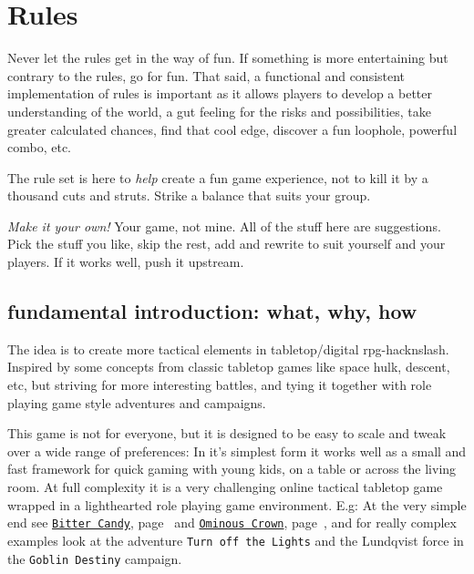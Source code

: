 

%
%


\cleardoublepage
\flushbottom


\chapter*{Rules}
Never let the rules get in the way of fun. If something is more entertaining but contrary to the rules, go for fun. That said, a functional and consistent implementation of rules is important as it allows players to develop a better understanding of the world, a gut feeling for the risks and possibilities, take greater calculated chances, find that cool edge, discover a fun loophole, powerful combo, etc.

The rule set is here to \emph{help} create a fun game experience, not to kill it by a thousand cuts and struts. Strike a balance that suits your group.

\emph{Make it your own!} Your game, not mine. All of the stuff here are suggestions. Pick the stuff you like, skip the rest, add and rewrite to suit yourself and your players. If it works well, push it upstream.


\section*{fundamental introduction: what, why, how}
The idea is to create more tactical elements in tabletop/digital rpg-hacknslash. Inspired by some concepts from classic tabletop games like space hulk, descent, etc, but striving for more interesting battles, and tying it together with role playing game style adventures and campaigns.

This game is not for everyone, but it is designed to be easy to scale and tweak over a wide range of preferences: In it's simplest form it works well as a small and fast framework for quick gaming with young kids, on a table or across the living room. At full complexity it is a very challenging online tactical tabletop game wrapped in a lighthearted role playing game environment.
E.g: At the very simple end see
\hyperref[sec:youngkids]{\texttt{Bitter Candy}}, page~\pageref{sec:youngkids} and
\hyperref[sec:basicenough]{\texttt{Ominous Crown}}, page~\pageref{sec:basicenough},
and for really complex examples look at the adventure
\texttt{Turn off the Lights} and
the Lundqvist force in the \texttt{Goblin Destiny}
campaign.

